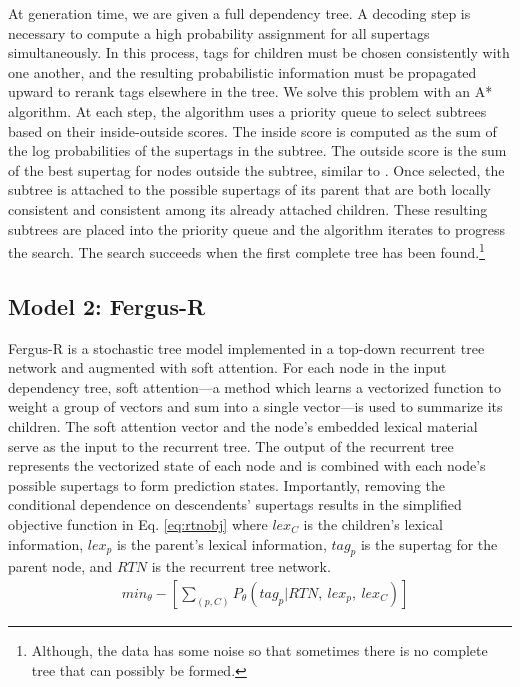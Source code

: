 \documentclass[11pt]{article}
\begin{document}
At generation time, we are given a full dependency tree.  A decoding
step is necessary to compute a high probability assignment for all
supertags simultaneously.
%
In this process, tags for children must be chosen consistently with
one another, and the resulting probabilistic information must be
propagated upward to rerank tags elsewhere in the tree.
%
We solve this problem with an A* algorithm.
%
At each step, the algorithm uses a priority queue to select subtrees based on their inside-outside scores.
%
The inside score is computed as the sum of the log probabilities of the supertags in the subtree.
%
The outside score is the sum of the best supertag for nodes outside the subtree, similar to .
%
Once selected, the subtree is attached to the possible supertags of its parent that are both locally consistent and consistent among its already attached children.
%
These resulting subtrees are placed into the priority queue and the algorithm iterates to progress the search.
%
The search succeeds when the first complete tree has been found.\footnote{Although, the data has some noise so that sometimes there is no complete tree that can possibly be formed.}

\subsection{Model 2: Fergus-R}

Fergus-R is a stochastic tree model implemented in a top-down recurrent tree network and augmented with soft attention.
%
For each node in the input dependency tree, soft attention---a method which learns a vectorized function to weight a group of vectors and sum into a single vector---is used to summarize its children.
%
The soft attention vector and the node's embedded lexical material serve as the input to the recurrent tree.
%
The output of the recurrent tree represents the vectorized state of each node and is combined with each node's possible supertags to form prediction states.
%
%
%
Importantly, removing the conditional dependence on descendents' supertags
results in the simplified objective function in Eq. \ref{eq:rtnobj} where $lex_C$ is the children's lexical information, $lex_p$ is the parent's lexical information, $tag_p$ is the supertag for the parent node, and $RTN$ is the recurrent tree network. 
%
\begin{align}
&min_{\theta} -[\sum_{(p,C)} P_\theta(tag_{p}|RTN,~lex_p,~lex_{C})] \label{eq:rtnobj}
\end{align}
\end{document}
